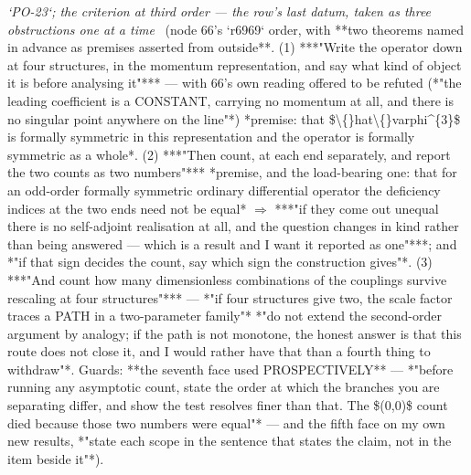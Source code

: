 \begin{description}
\textit{`PO-23`; the criterion at third order --- the row's last datum, taken as three obstructions one at a time} \ (node 66's `r6969` order, with **two theorems named in advance as premises asserted from outside**. (1) ***"Write the operator down at four structures, in the momentum representation, and say what kind of object it is before analysing it"*** --- with 66's own reading offered to be refuted (*"the leading coefficient is a CONSTANT, carrying no momentum at all, and there is no singular point anywhere on the line"*)  *premise: that \$\textbackslash\{\}hat\textbackslash\{\}varphi\textasciicircum{}\{3\}\$ is formally symmetric in this representation and the operator is formally symmetric as a whole*. (2) ***"Then count, at each end separately, and report the two counts as two numbers"***  *premise, and the load-bearing one: that for an odd-order formally symmetric ordinary differential operator the deficiency indices at the two ends need not be equal* \ensuremath{\Rightarrow} ***"if they come out unequal there is no self-adjoint realisation at all, and the question changes in kind rather than being answered --- which is a result and I want it reported as one"***; and *"if that sign decides the count, say which sign the construction gives"*. (3) ***"And count how many dimensionless combinations of the couplings survive rescaling at four structures"*** --- *"if four structures give two, the scale factor traces a PATH in a two-parameter family"*  *"do not extend the second-order argument by analogy; if the path is not monotone, the honest answer is that this route does not close it, and I would rather have that than a fourth thing to withdraw"*.  Guards: **the seventh face used PROSPECTIVELY** --- *"before running any asymptotic count, state the order at which the branches you are separating differ, and show the test resolves finer than that. The \$(0,0)\$ count died because those two numbers were equal"* --- and the fifth face on my own new results, *"state each scope in the sentence that states the claim, not in the item beside it"*). 

\end{description}
